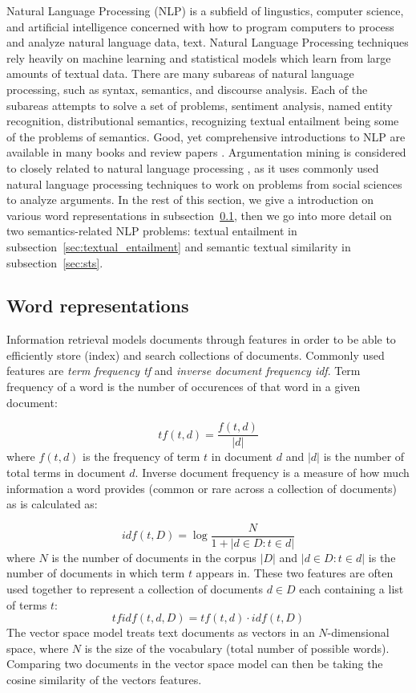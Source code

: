 Natural Language Processing (NLP) is a subfield of lingustics, computer
science, and artificial intelligence concerned with how to program computers to
process and analyze natural language data, text.  Natural Language Processing
techniques rely heavily on machine learning and statistical models which learn
from large amounts of textual data.  There are many subareas of natural
language processing, such as syntax, semantics, and discourse analysis.
Each of the subareas attempts to solve a set of problems, sentiment analysis, named
entity recognition, distributional semantics, recognizing textual entailment being
some of the problems of semantics. Good, yet comprehensive introductions to NLP are available 
in many books \citep{manning1999foundations} and review papers \citep{collobert2011natural}. 
Argumentation
mining is considered to closely related to natural language processing
\citep{lippi2015argument}, as it uses commonly used natural language processing
techniques to work on problems from social sciences to analyze arguments.
In the rest of this section, we give a introduction on various word representations
in subsection~\ref{sec:word_representations}, then we go into more detail on two 
semantics-related NLP problems: textual entailment in subsection~\ref{sec:textual_entailment}
and semantic textual similarity in subsection~\ref{sec:sts}.

\subsection{Word representations}
\label{sec:word_representations}

Information retrieval models documents through features in order to be able to efficiently 
store (index) and search collections of documents. Commonly used features are 
\textit{term frequency tf} and \textit{inverse document frequency idf}. Term frequency of a word
is the number of occurences of that word in a given document:

$$
\mathit{tf}(t, d) = \frac{f(t, d)}{|d|}
$$
where $f(t, d)$ is the frequency of term $t$ in document $d$ and $|d|$ is the number
of total terms in document $d$.
Inverse document frequency is a measure of how much information a word provides (common or rare
across a collection of documents) as is calculated as:

\begin{equation}
	\label{eq:idf}
\mathit{idf}(t, D) = \log \frac{N}{1 + |d \in D: t \in d|}
\end{equation}
where $N$ is the number of documents in the corpus $|D|$ and $|d \in D: t \in d|$ is the 
number of documents in which term $t$ appears in. 
These two features are often used together to represent a collection of documents 
$d \in D$ each containing a list of terms $t$:
$$
\mathit{tfidf} (t, d, D) = \mathit{tf}(t, d) \cdot \mathit{idf}(t, D)
$$
The vector space model \citep{meadow1992text} treats text documents as vectors  
in an $N$-dimensional space, where $N$ is the size of the vocabulary (total number of 
possible words). Comparing two documents in the vector space model can then be taking the
cosine similarity of the vectors features.

